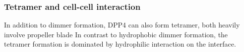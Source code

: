 \subsubsection{Tetramer and cell-cell interaction}

In addition to dimmer formation, DPP4 can also form tetramer, both heavily involve  propeller blade In contrast to hydrophobic dimmer formation, the tetramer formation is dominated by hydrophilic interaction on the interface.~\cite{Engel_2003} 